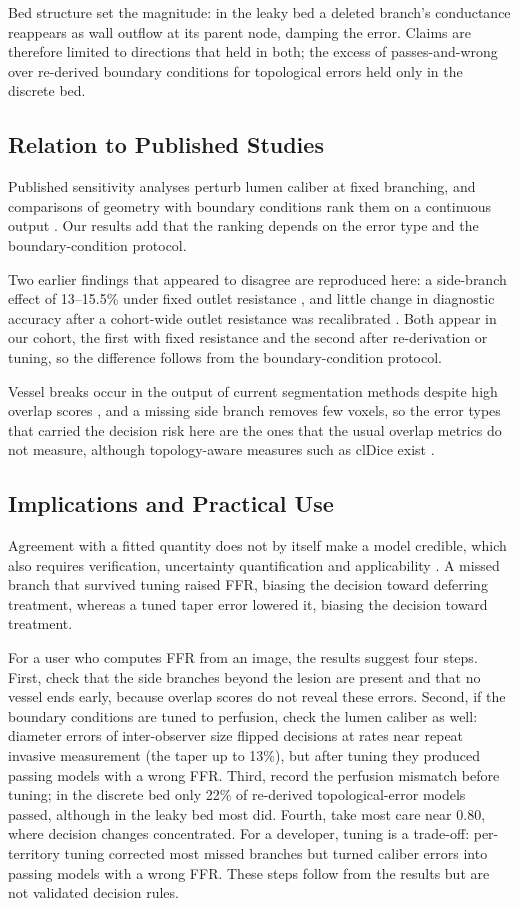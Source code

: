 \documentclass[journal]{IEEEtran}
\begin{document}
Bed structure set the magnitude: in the leaky bed a deleted branch's conductance reappears as wall outflow at its
parent node, damping the error. Claims are therefore limited to directions that held in both; the
excess of passes-and-wrong over re-derived boundary conditions for topological errors held only in the discrete bed.

\subsection{Relation to Published Studies}
Published sensitivity analyses perturb lumen caliber at fixed branching, and comparisons of geometry with boundary
conditions rank them on a continuous output \cite{sankaran2016,tanade2022,korte2023}. Our results add that the
ranking depends on the error type and the boundary-condition protocol.

Two earlier findings that appeared to disagree are reproduced here: a side-branch effect of 13--15.5\% under fixed
outlet resistance \cite{gamage2022}, and little change in diagnostic accuracy after a cohort-wide outlet resistance
was recalibrated \cite{gosling2020}. Both appear in our cohort, the first with fixed resistance and the second after re-derivation or tuning, so the difference follows
from the boundary-condition protocol.

Vessel breaks occur in the output of current segmentation methods despite high overlap scores \cite{bransby2026},
and a missing side branch removes few voxels, so the error types that carried the decision risk here are the ones that the usual overlap metrics do not measure, although topology-aware measures such as clDice
exist \cite{shit2021}.

\subsection{Implications and Practical Use}
Agreement with a fitted quantity does not by itself make a model credible, which also requires verification,
uncertainty quantification and applicability \cite{viceconti2025}. A missed branch that survived tuning raised FFR, biasing the decision toward
deferring treatment, whereas a tuned taper error lowered it, biasing the decision toward treatment.

For a user who computes FFR from an image, the results suggest four steps. First, check that the side branches
beyond the lesion are present and that no vessel ends early, because overlap scores do not reveal these errors.
Second, if the boundary conditions are tuned to perfusion, check the lumen caliber as well: diameter errors of
inter-observer size flipped decisions at rates near repeat invasive measurement (the taper up to 13\%), but after
tuning they produced passing models with a wrong FFR. Third, record the perfusion mismatch before tuning; in the discrete bed
only 22\% of re-derived topological-error models passed, although in the leaky bed most did. Fourth, take most care near 0.80,
where decision changes concentrated. For a developer, tuning is a trade-off: per-territory tuning corrected most
missed branches but turned caliber errors into passing models with a wrong FFR. These steps follow from the results
but are not validated decision rules.
\end{document}
